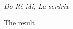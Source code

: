 \documentclass[preview]{standalone}
\begin{document}
\begin{center}
\emph{Do Ré Mi, La perdrix}

  The result
\end{center}
\end{document}
